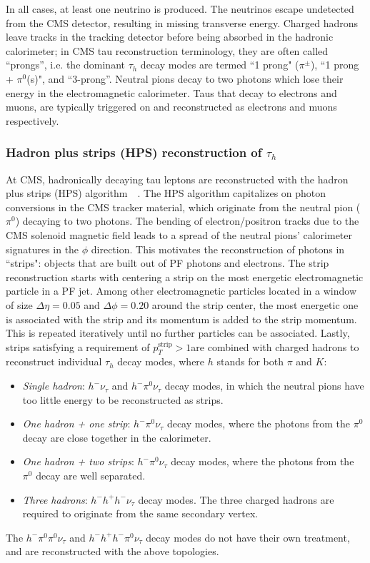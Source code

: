 In all cases, at least one neutrino is produced. The neutrinos escape undetected from the CMS detector, resulting in missing transverse energy. Charged hadrons leave tracks in the tracking detector before being absorbed in the hadronic calorimeter; in CMS tau reconstruction terminology, they are often called ``prongs'', i.e. the dominant $\tau_{h}$ decay modes are termed ``1 prong" ($\pi^\pm$), ``1 prong + $\pi^0$(s)", and ``3-prong''. Neutral pions decay to two photons which lose their energy in the electromagnetic calorimeter. Taus that decay to electrons and muons, are typically triggered on and reconstructed as electrons and muons respectively. 

\subsubsection{Hadron plus strips (HPS) reconstruction of \texorpdfstring{$\tau_{h}$}{tauh}}
At CMS, hadronically decaying tau leptons are reconstructed with the hadron plus strips (HPS) algorithm~\cite{CMS-TAU-14-001}~\cite{2012-JINST-7-P01001}. The HPS algorithm capitalizes on photon conversions in the CMS tracker material, which originate from the neutral pion ($\pi^0$) decaying to two photons. The bending of electron/positron tracks due to the CMS solenoid magnetic field leads to a spread of the neutral pions' calorimeter signatures in the $\phi$ direction. This motivates the reconstruction of photons in ``strips": objects that are built out of PF photons and electrons. The strip reconstruction starts with centering a strip on the most energetic electromagnetic particle in a PF jet. Among other electromagnetic particles located in a window of size $\Delta \eta = 0.05$ and $\Delta \phi = 0.20$ around the strip center, the most energetic one is associated with the strip and its momentum is added to the strip momentum. This is repeated iteratively until no further particles can be associated. Lastly, strips satisfying a requirement of $p_{T}^{\text{strip}} > 1$\GeV are combined with charged hadrons to reconstruct individual $\tau_{h}$ decay modes, where $h$ stands for both $\pi$ and $K$:
\begin{itemize}
    \item \textit{Single hadron}: $h^- \nu_{\tau}$ and $h^- \pi^0 \nu_{\tau}$ decay modes, in which the neutral pions have too little energy to be reconstructed as strips.
    \item \textit{One hadron + one strip}: $h^- \pi^0 \nu_{\tau}$ decay modes, where the photons from the $\pi^0$ decay are close together in the calorimeter.
    \item \textit{One hadron + two strips}: $h^- \pi^0 \nu_{\tau}$ decay modes, where the photons from the $\pi^0$ decay are well separated. 
    \item \textit{Three hadrons}: $h^- h^+ h^- \nu_{\tau}$ decay modes. The three charged hadrons are required to originate from the same secondary vertex.
\end{itemize}
The $h^- \pi^0 \pi^0 \nu_{\tau}$ and $h^- h^+ h^- \pi^0 \nu_{\tau}$ decay modes do not have their own treatment, and are reconstructed with the above topologies. 

